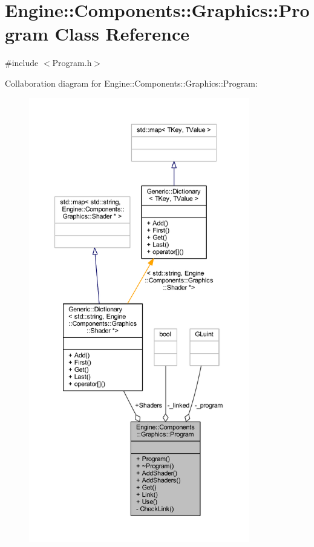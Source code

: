 \hypertarget{classEngine_1_1Components_1_1Graphics_1_1Program}{}\section{Engine\+:\+:Components\+:\+:Graphics\+:\+:Program Class Reference}
\label{classEngine_1_1Components_1_1Graphics_1_1Program}


{\ttfamily \#include $<$Program.\+h$>$}



Collaboration diagram for Engine\+:\+:Components\+:\+:Graphics\+:\+:Program\+:
\nopagebreak
\begin{figure}[H]
\begin{center}
\leavevmode
\includegraphics[height=550pt]{classEngine_1_1Components_1_1Graphics_1_1Program__coll__graph}
\end{center}
\end{figure}

